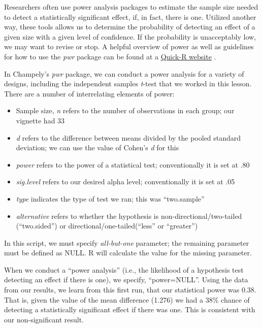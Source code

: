 \documentclass[
  11pt,
]{book}
\providecommand{\tightlist}{%
  \setlength{\itemsep}{0pt}\setlength{\parskip}{0pt}}
\begin{document}
Researchers often use power analysis packages to estimate the sample size needed to detect a statistically significant effect, if, in fact, there is one. Utilized another way, these tools allows us to determine the probability of detecting an effect of a given size with a given level of confidence. If the probability is unacceptably low, we may want to revise or stop. A helpful overview of power as well as guidelines for how to use the \emph{pwr} package can be found at a \href{https://www.statmethods.net/stats/power.html}{Quick-R website} \citep{kabacoff_power_2017}.

In Champely's \emph{pwr} package, we can conduct a power analysis for a variety of designs, including the independent samples \emph{t}-test that we worked in this lesson. There are a number of interrelating elements of power:

\begin{itemize}
\tightlist
\item
  Sample size, \emph{n} refers to the number of observations in each group; our vignette had 33
\item
  \emph{d} refers to the difference between means divided by the pooled standard deviation; we can use the value of Cohen's \emph{d} for this
\item
  \emph{power} refers to the power of a statistical test; conventionally it is set at .80
\item
  \emph{sig.level} refers to our desired alpha level; conventionally it is set at .05
\item
  \emph{type} indicates the type of test we ran; this was ``two.sample''
\item
  \emph{alternative} refers to whether the hypothesis is non-directional/two-tailed (``two.sided'') or directional/one-tailed(``less'' or ``greater'')
\end{itemize}

In this script, we must specify \emph{all-but-one} parameter; the remaining parameter must be defined as NULL. R will calculate the value for the missing parameter.

When we conduct a ``power analysis'' (i.e., the likelihood of a hypothesis test detecting an effect if there is one), we specify, ``power=NULL''. Using the data from our results, we learn from this first run, that our statistical power was 0.38. That is, given the value of the mean difference (1.276) we had a 38\% chance of detecting a statistically significant effect if there was one. This is consistent with our non-significant result.
\end{document}
